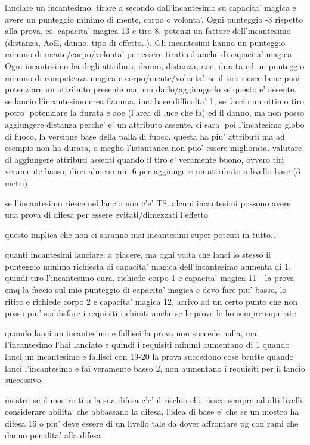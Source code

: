 \documentclass[12pt,a4paper,twoside,openany,twocolumn]{book}
\begin{document}
lanciare un incantesimo: tirare a secondo dall'incantesimo su capacita' magica e avere un punteggio minimo di  mente, corpo o volonta'.  Ogni punteggio -3 rispetto alla prova, es. capacita' magica 13 e tiro 8, potenzi un fattore dell'incantesimo (distanza, AoE, danno, tipo di effetto..). Gli incantesimi hanno un punteggio minimo di mente/corpo/volonta' per essere tirati ed anche di capacita' magica
Ogni incantesimo ha degli attributi, danno, distanza, aoe, durata ed un punteggio minimo di competenza magica e corpo/mente/volonta'. se il tiro riesce bene puoi potenziare un attributo presente ma non darlo/aggiungerlo se questo e' assente. se lancio l'incantesimo crea fiamma, inc. base difficolta' 1, se faccio un ottimo tiro potro' potenziare la durata e aoe (l'area di luce che fa) ed il danno, ma non posso aggiungere distanza perche' e' un attributo assente.
ci sara' poi l'incatesimo globo di fuoco, la versione base della palla di fuoco, questa ha piu' attributi ma ad esempio non ha durata, o meglio l'istantanea non puo' essere migliorata.
valutare di aggiungere attributi assenti quando il tiro e' veramente buono, ovvero tiri veramente basso, direi almeno un -6 per aggiungere un attributo a livello base (3 metri)

se l'incantesimo riesce nel lancio non c'e' TS. alcuni incantesimi possono avere una prova di difesa per essere evitati/dimezzati l'effetto

questo implica che non ci saranno mai incantesimi super potenti in tutto..

quanti incantesimi lanciare:  a piacere, ma ogni volta che lanci lo stesso il punteggio minimo richiesta di capacita' magica dell'incantesimo aumenta di 1. quindi tiro l'incantesimo cura, richiede corpo 1 e capacita' magica 11 - la prova cmq la faccio sul mio punteggio di capacita' magica e devo fare piu' basso, lo ritiro e richiede corpo 2 e capacita' magica 12, arrivo ad un certo punto che non posso piu' soddisfare i requisiti richiesti anche se le prove le ho sempre superate

quando lanci un incantesimo e fallisci la prova non succede nulla, ma l'incantesimo l'hai lanciato e quindi i requisiti minimi aumentano di 1
quando lanci un incantesimo e fallisci con 19-20 la prova succedono cose  brutte
quando lanci l'incantesimo e fai veramente basso 2, non aumentano i requisiti per il lancio successivo.


mostri:
se il mostro tira la sua difesa c'e' il rischio che riesca sempre ad alti livelli. considerare abilita' che abbassano la difesa, l'idea di base e' che se un mostro ha difesa 16 o piu' deve essere di un livello tale da dover affrontare pg con rami che danno penalita' alla difesa
\end{document}
